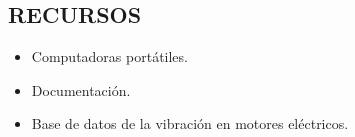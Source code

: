 
\subsection{RECURSOS}
\begin{itemize}	
	\item Computadoras portátiles.
	\item Documentación.
	\item Base de datos de la vibración en motores eléctricos.
\end{itemize}	